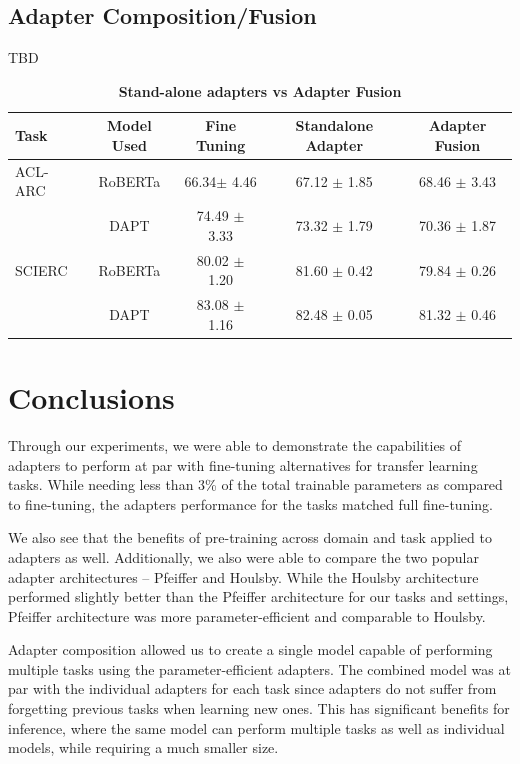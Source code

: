 \documentclass[10pt,twocolumn,letterpaper]{article}
\begin{document}
\subsection{Adapter Composition/Fusion}
TBD


\begin{table}[h]
\centering
\begin{tabular}{lcccc}
\hline
\textbf{Task} & \textbf{Model Used} & \textbf{Fine Tuning} & \textbf{Standalone Adapter} & \textbf{Adapter Fusion} \\
\hline
ACL-ARC & RoBERTa & 66.34$ \pm$ 4.46 & 67.12 $\pm$ 1.85 & 68.46 $\pm$ 3.43 \\
 & DAPT & 74.49 $\pm$ 3.33 & 73.32 $\pm$ 1.79 & 70.36 $\pm$ 1.87 \\
 \hline
SCIERC & RoBERTa & 80.02 $\pm$ 1.20 & 81.60 $\pm$ 0.42 & 79.84 $\pm$ 0.26 \\
 & DAPT & 83.08 $\pm$ 1.16 & 82.48 $\pm$ 0.05 & 81.32 $\pm$ 0.46 \\
\hline
\end{tabular}
\caption{\textbf{Stand-alone adapters vs Adapter Fusion}}
\label{tab:fusionresults}
\end{table}



\section{Conclusions}
Through our experiments, we were able to demonstrate the capabilities of adapters to perform at par with fine-tuning alternatives for transfer learning tasks. While needing less than 3\% of the total trainable parameters as compared to fine-tuning, the adapters performance for the tasks matched full fine-tuning.

We also see that the benefits of pre-training across domain and task applied to adapters as well.
Additionally, we also were able to compare the two popular adapter architectures – Pfeiffer and Houlsby. While the Houlsby architecture performed slightly better than the Pfeiffer architecture for our tasks and settings, Pfeiffer architecture was more parameter-efficient and comparable to Houlsby. 

Adapter composition allowed us to create a single model capable of performing multiple tasks using the parameter-efficient adapters. The combined model was at par with the individual adapters for each task since adapters do not suffer from forgetting previous tasks when learning new ones. This has significant benefits for inference, where the same model can perform multiple tasks as well as individual models, while requiring a much smaller size.
\end{document}
